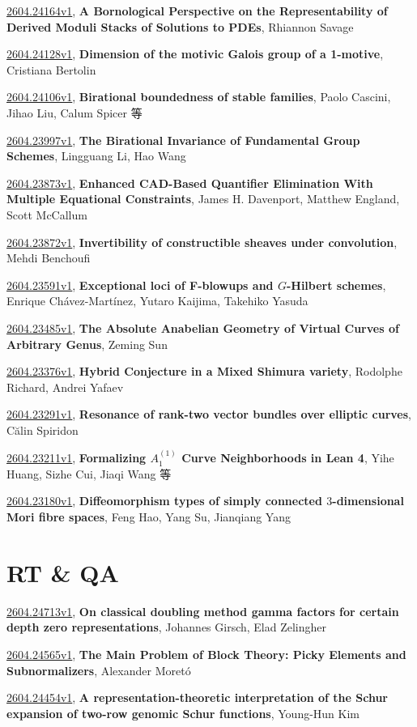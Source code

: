 \documentclass[9pt, a4paper]{article}
\theoremstyle{plain}
\theoremstyle{definition}
\theoremstyle{remark}
\newcommand{\arxiv}[3]{\href{https://arxiv.org/abs/#1}{#1}, \textbf{\textcolor{arxivblue}{#2}}, #3}
\begin{document}
\arxiv{2604.24164v1}{A Bornological Perspective on the Representability of Derived Moduli Stacks of Solutions to PDEs}{Rhiannon Savage}

\arxiv{2604.24128v1}{Dimension of the motivic Galois group of a 1-motive}{Cristiana Bertolin}

\arxiv{2604.24106v1}{Birational boundedness of stable families}{Paolo Cascini, Jihao Liu, Calum Spicer 等}

\arxiv{2604.23997v1}{The Birational Invariance of Fundamental Group Schemes}{Lingguang Li, Hao Wang}

\arxiv{2604.23873v1}{Enhanced CAD-Based Quantifier Elimination With Multiple Equational Constraints}{James H. Davenport, Matthew England, Scott McCallum}

\arxiv{2604.23872v1}{Invertibility of constructible sheaves under convolution}{Mehdi Benchoufi}

\arxiv{2604.23591v1}{Exceptional loci of F-blowups and $G$-Hilbert schemes}{Enrique Chávez-Martínez, Yutaro Kaijima, Takehiko Yasuda}

\arxiv{2604.23485v1}{The Absolute Anabelian Geometry of Virtual Curves of Arbitrary Genus}{Zeming Sun}

\arxiv{2604.23376v1}{Hybrid Conjecture in a Mixed Shimura variety}{Rodolphe Richard, Andrei Yafaev}

\arxiv{2604.23291v1}{Resonance of rank-two vector bundles over elliptic curves}{Călin Spiridon}

\arxiv{2604.23211v1}{Formalizing $A_1^{(1)}$ Curve Neighborhoods in Lean 4}{Yihe Huang, Sizhe Cui, Jiaqi Wang 等}

\arxiv{2604.23180v1}{Diffeomorphism types of simply connected $3$-dimensional Mori fibre spaces}{Feng Hao, Yang Su, Jianqiang Yang}


\section{RT \& QA}
\arxiv{2604.24713v1}{On classical doubling method gamma factors for certain depth zero representations}{Johannes Girsch, Elad Zelingher}

\arxiv{2604.24565v1}{The Main Problem of Block Theory: Picky Elements and Subnormalizers}{Alexander Moretó}

\arxiv{2604.24454v1}{A representation-theoretic interpretation of the Schur expansion of two-row genomic Schur functions}{Young-Hun Kim}
\end{document}
